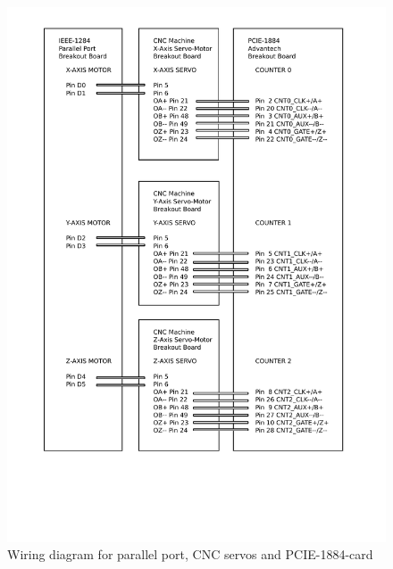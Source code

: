 \clearpage
\pagebreak

\begin{figure}
	\caption{Wiring diagram for parallel port, CNC servos and PCIE-1884-card}
    \label{Parport-CNC-servo-PCIE-1884-wiring-diagram.pdf}
	\includegraphics[width=1.00\textwidth]{Appendix/Work-environment-setup/Parport-CNC-servo-PCIE-1884-wiring-diagram.pdf} 

\end{figure}

	